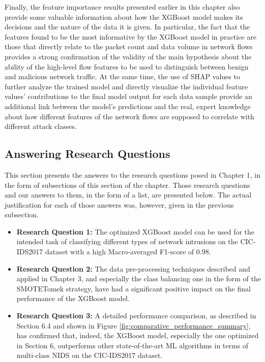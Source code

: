 Finally, the feature importance results presented earlier in this chapter also provide some valuable information about how the XGBoost model makes its decisions and the nature of the data it is given. In particular, the fact that the features found to be the most informative by the XGBoost model in practice are those that directly relate to the packet count and data volume in network flows provides a strong confirmation of the validity of the main hypothesis about the ability of the high-level flow features to be used to distinguish between benign and malicious network traffic. At the same time, the use of SHAP values to further analyze the trained model and directly visualize the individual feature values’ contributions to the final model output for each data sample provide an additional link between the model’s predictions and the real, expert knowledge about how different features of the network flows are supposed to correlate with different attack classes.

\subsection{Answering Research Questions} 

This section presents the answers to the research questions posed in Chapter 1, in the form of subsections of this section of the chapter. Those research questions and our answers to them, in the form of a list, are presented below. The actual justification for each of those answers was, however, given in the previous subsection.

\begin{itemize} 
\item \textbf{Research Question 1: } The optimized XGBoost model can be used for the intended task of classifying different types of network intrusions on the CIC-IDS2017 dataset with a high Macro-averaged F1-score of $0.98$.
\item \textbf{Research Question 2: } The data pre-processing techniques described and applied in Chapter 3, and especially the class balancing one in the form of the SMOTETomek strategy, have had a significant positive impact on the final performance of the XGBoost model.
\item \textbf{Research Question 3: } A detailed performance comparison, as described in Section 6.4 and shown in Figure \ref{fig:comparative_performance_summary}, has confirmed that, indeed, the XGBoost model, especially the one optimized in Section 6, outperforms other state-of-the-art ML algorithms in terms of multi-class NIDS on the CIC-IDS2017 dataset.
\end{itemize} 

